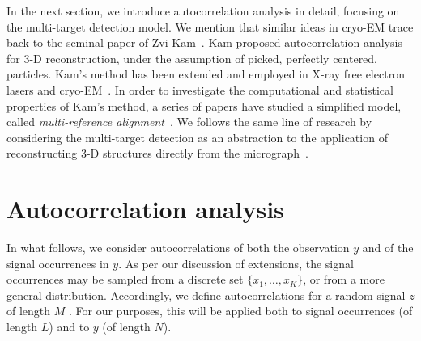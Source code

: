 \documentclass[12pt]{article}
\newcommand{\1}{\mathbf{1}}
\theoremstyle{plain}
\theoremstyle{definition}
\theoremstyle{remark}
\theoremstyle{plain}
\theoremstyle{remark}
\theoremstyle{plain}
\theoremstyle{plain}
\theoremstyle{plain}
\numberwithin{equation}{section}
\begin{document}
In the next section, we introduce autocorrelation analysis in detail, focusing on the multi-target detection model. 
We mention that similar ideas in  cryo-EM trace back to the seminal paper of Zvi Kam~\cite{kam1980reconstruction}. Kam proposed autocorrelation analysis for {3-D} reconstruction, under the assumption of picked, perfectly centered, particles. Kam's method has been extended and employed in X-ray free electron lasers and cryo-EM~\cite{liu2013three,kurta2017correlations,levin20173d,von2018structure}.  
In order to investigate the computational and statistical properties of Kam's method, a series of papers have studied a simplified model, 
called   \emph{multi-reference alignment}~\cite{bandeira2014multireference,bendory2017bispectrum,bandeira2017optimal,perry2017sample,bandeira2017estimation,abbe2017multireference}.
We follows the same line of research by considering the multi-target detection as an abstraction to the application of reconstructing 3-D structures directly from the micrograph~\cite{bendory2018toward}.

\section{Autocorrelation analysis} \label{sec:AC_analysis}

In what follows, we consider autocorrelations of both the observation $y$ and of the signal occurrences in $y$. As per our discussion of extensions, the signal occurrences may be sampled from a discrete set $\{x_1, \ldots, x_K\}$, or from a more general distribution. Accordingly, we define autocorrelations for a random signal $z$ of length $M$ . For our purposes, this will be applied both to signal occurrences (of length $L$) and to $y$ (of length $N$).
\end{document}
